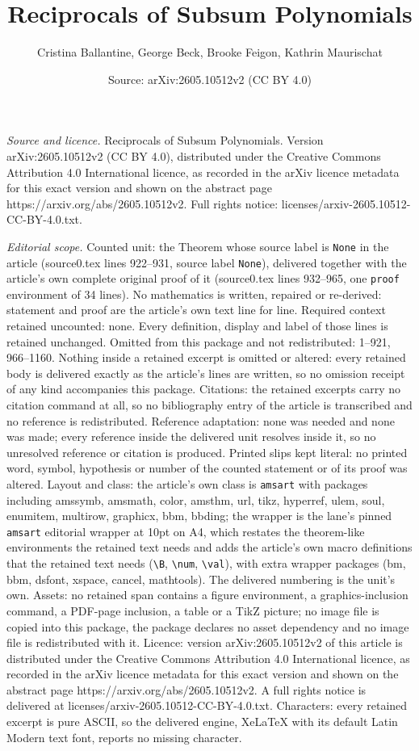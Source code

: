 \documentclass[10pt,a4paper]{amsart}
\title[Reciprocals of Subsum Polynomials]{Reciprocals of Subsum Polynomials}
\author{Cristina Ballantine, George Beck, Brooke Feigon, Kathrin Maurischat}
\date{Source: arXiv:2605.10512v2 (CC BY 4.0)}
\begin{document}
\maketitle

\noindent\emph{Source and licence.} Reciprocals of Subsum Polynomials. Version arXiv:2605.10512v2 (CC BY 4.0), distributed under the Creative Commons Attribution 4.0 International licence, as recorded in the arXiv licence metadata for this exact version and shown on the abstract page https://arxiv.org/abs/2605.10512v2. Full rights notice: licenses/arxiv-2605.10512-CC-BY-4.0.txt.\par\smallskip

\noindent\textit{Editorial scope.} Counted unit: the Theorem whose source label is \texttt{None} in the article (source0.tex lines 922--931, source label \texttt{None}), delivered together with the article's own complete original proof of it (source0.tex lines 932--965, one \texttt{proof} environment of 34 lines). No mathematics is written, repaired or re-derived: statement and proof are the article's own text line for line. Required context retained uncounted: none. Every definition, display and label of those lines is retained unchanged. Omitted from this package and not redistributed: 1--921, 966--1160. Nothing inside a retained excerpt is omitted or altered: every retained body is delivered exactly as the article's lines are written, so no omission receipt of any kind accompanies this package. Citations: the retained excerpts carry no citation command at all, so no bibliography entry of the article is transcribed and no reference is redistributed. Reference adaptation: none was needed and none was made; every reference inside the delivered unit resolves inside it, so no unresolved reference or citation is produced. Printed slips kept literal: no printed word, symbol, hypothesis or number of the counted statement or of its proof was altered. Layout and class: the article's own class is \texttt{amsart} with packages including amssymb, amsmath, color, amsthm, url, tikz, hyperref, ulem, soul, enumitem, multirow, graphicx, bbm, bbding; the wrapper is the lane's pinned \texttt{amsart} editorial wrapper at 10pt on A4, which restates the theorem-like environments the retained text needs and adds the article's own macro definitions that the retained text needs (\texttt{\textbackslash B}, \texttt{\textbackslash num}, \texttt{\textbackslash val}), with extra wrapper packages (bm, bbm, dsfont, xspace, cancel, mathtools). The delivered numbering is the unit's own. Assets: no retained span contains a figure environment, a graphics-inclusion command, a PDF-page inclusion, a table or a TikZ picture; no image file is copied into this package, the package declares no asset dependency and no image file is redistributed with it. Licence: version arXiv:2605.10512v2 of this article is distributed under the Creative Commons Attribution 4.0 International licence, as recorded in the arXiv licence metadata for this exact version and shown on the abstract page https://arxiv.org/abs/2605.10512v2. A full rights notice is delivered at licenses/arxiv-2605.10512-CC-BY-4.0.txt. Characters: every retained excerpt is pure ASCII, so the delivered engine, XeLaTeX with its default Latin Modern text font, reports no missing character.
\end{document}
